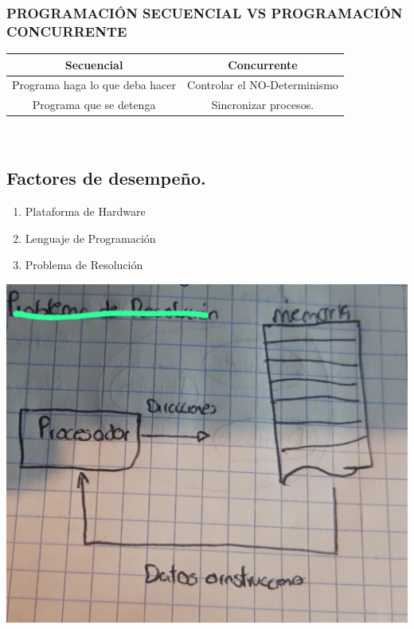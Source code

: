 \documentclass[12pt]{article}
\begin{document}
\subsubsection*{\textbf{PROGRAMACIÓN SECUENCIAL VS PROGRAMACIÓN CONCURRENTE}}
\begin{tabular}{| c | c |}
    \hline
    Secuencial & Concurrente \\ \hline
    Programa haga lo que deba hacer & Controlar el NO-Determinismo \\
    Programa que se detenga & Sincronizar procesos.
\end{tabular}
\\
\vspace{1em}

{\color{blue} \subsection*{\textbf{Factores de desempeño.}}}
\begin{enumerate}
    \item Plataforma de Hardware
    \item Lenguaje de Programación
    \item Problema de Resolución
\end{enumerate}

\includegraphics[scale = 0.25]{images/esquema1.jpeg} \\
\end{document}
